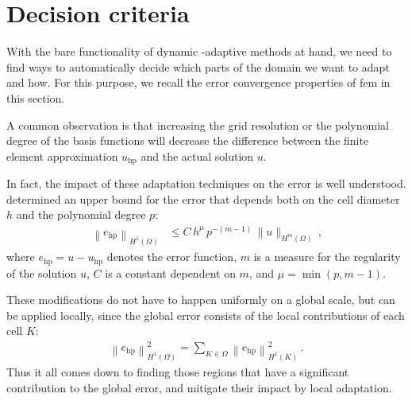 \section{Decision criteria}
\label{sec:decision}

With the bare functionality of dynamic \hp-adaptive methods at hand, we need to find ways to automatically decide which parts of the domain we want to adapt and how. For this purpose, we recall the error convergence properties of \gls{fem} in this section.

A common observation is that increasing the grid resolution or the polynomial degree of the basis functions will decrease the difference between the finite element approximation $u_\text{hp}$ and the actual solution $u$.

In fact, the impact of these adaptation techniques on the error is well understood. \textcite[Thm.~3.4]{babuska1990} determined an upper bound for the error that depends both on the cell diameter $h$ and the polynomial degree $p$:
\begin{align}
\label{eq:errorbound_hp} \left\|e_\text{hp}\right\|_{H^{1}(\Omega)} &\leq C \, h^{\mu} \, p^{-(m-1)} \, \|u\|_{H^{m}(\Omega)} \,\text{,}
\end{align}
where $e_\text{hp} = u - u_\text{hp}$ denotes the error function, $m$ is a measure for the regularity of the solution $u$, $C$ is a constant dependent on $m$, and $\mu = \min \left(p, m - 1\right)$.

These modifications do not have to happen uniformly on a global scale, but can be applied locally, since the global error consists of the local contributions of each cell $K$:
\begin{align}
\label{eq:error_sum} \left\|e_\text{hp}\right\|_{H^1(\Omega)}^2 = \sum\limits_{K \in \Omega} \left\|e_\text{hp}\right\|_{H^1(K)}^2 \,\text{.}
\end{align}
Thus it all comes down to finding those regions that have a significant contribution to the global error, and mitigate their impact by local adaptation.


